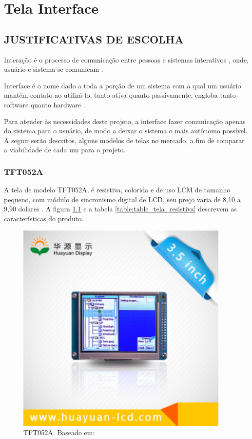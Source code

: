 \chapter[Tela Interface]{Tela Interface}

\section{JUSTIFICATIVAS DE ESCOLHA}

Interação é o processo de comunicação entre pessoas e sistemas interativos \cite{prates},
onde, usuário e sistema se comunicam \cite{preece}.

Interface é o nome dado a toda a porção de um sistema com a qual um usuário
mantém contato ao utilizá-lo, tanto ativa quanto passivamente, engloba tanto
software quanto hardware \cite{preece}.

Para atender às necessidades deste projeto, a interface fazer comunicação
 apenas do sistema para o usuário, de modo a deixar o sistema o mais autônomo
  possível. A seguir serão descritos, alguns modelos de telas no mercado, a
   fim de comparar a viabilidade de cada um para o projeto.

\subsection{TFT052A}

A tela de modelo TFT052A, é resistiva, colorida e de uso LCM de tamanho pequeno,
com módulo de sincronismo digital de LCD, seu preço varia de 8,10 a 9,90 dolares \cite{tela_resistiva}.
A figura \ref{fig:imagem_interface} e a tabela \ref{table:table_tela_resistiva} descrevem as
características do produto.

\begin{figure}[h]
  \centering
  \includegraphics[width=400px, scale=1]{figuras/imagem_interface}
  \caption{TFT052A. Baseado em: \cite{tela_resistiva}}
\label{fig:imagem_interface}
\end{figure}

